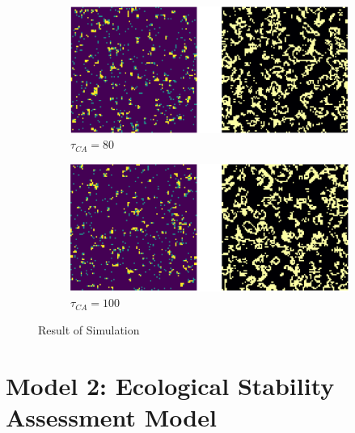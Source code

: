\documentclass{mcmthesis}
\begin{document}
\begin{figure}[H]
  \begin{subfigure}[b]{0.45\textwidth}
    \includegraphics[width=\textwidth]{figures/NormalSimulation_5.png}
    \caption{$\tau_{CA} = 80$}
    \label{fig:sub5}
  \end{subfigure}
  \hfill
  \begin{subfigure}[b]{0.45\textwidth}
    \includegraphics[width=\textwidth]{figures/NormalSimulation_6.png}
    \caption{$\tau_{CA} = 100$}
    \label{fig:sub6}
  \end{subfigure}
  
  \caption{Result of Simulation}
  \label{fig:Result of Simulation}
\end{figure}


\section{Model 2: Ecological Stability Assessment Model}
\end{document}
